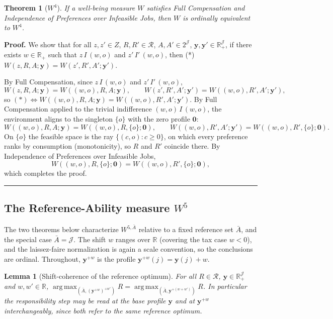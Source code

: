 \documentclass[12pt,thmsb]{article}
\DeclareMathOperator*{\argmax}{arg\,max}
\newtheorem{theorem}{Theorem}
\newtheorem{lemma}{Lemma}
\newenvironment{proof}[1][Proof]{\noindent \textbf{#1.} }{\  \rule{0.5em}{0.5em}}
\begin{document}
\begin{theorem}[$W^4$]
\label{thm:w4}
If a well-being measure $W$ satisfies Full Compensation and Independence of
Preferences over Infeasible Jobs, then $W$ is ordinally equivalent to $W^4$.
\end{theorem}

\begin{proof}
We show that for all $z,z'\in Z$, $R,R'\in\mathcal R$, $A,A'\in 2^{\mathcal J}$,
$\mathbf y,\mathbf y'\in\mathbb R_+^{\mathcal J}$, if there exists
$w\in\mathbb R_+$ such that $z\,I\,(w,o)$ and $z'\,I'\,(w,o)$, then (*)
$W(z,R,A;\mathbf y)=W(z',R',A';\mathbf y')$.

By Full Compensation, since $z\,I\,(w,o)$ and $z'\,I'\,(w,o)$,
\begin{equation*}
W(z,R,A;\mathbf y)=W((w,o),R,A;\mathbf y),\qquad
W(z',R',A';\mathbf y')=W((w,o),R',A';\mathbf y'),
\end{equation*}
so $(*)\Leftrightarrow W((w,o),R,A;\mathbf y)=W((w,o),R',A';\mathbf y')$. By
Full Compensation applied to the trivial indifference $(w,o)\,I\,(w,o)$, the
environment aligns to the singleton $\{o\}$ with the zero profile $\mathbf 0$:
\begin{equation*}
W((w,o),R,A;\mathbf y)=W((w,o),R,\{o\};\mathbf 0),\qquad
W((w,o),R',A';\mathbf y')=W((w,o),R',\{o\};\mathbf 0).
\end{equation*}
On $\{o\}$ the feasible space is the ray $\{(c,o):c\geq 0\}$, on which every
preference ranks by consumption (monotonicity), so $R$ and $R'$ coincide there.
By Independence of Preferences over Infeasible Jobs,
\begin{equation*}
W((w,o),R,\{o\};\mathbf 0)=W((w,o),R',\{o\};\mathbf 0),
\end{equation*}
which completes the proof.
\end{proof}

\subsection{The Reference-Ability measure $W^5$}

The two theorems below characterize $W^{5,\bar A}$ relative to a fixed reference
set $\bar A$, and the special case $\bar A=\mathcal J$. The shift $w$ ranges
over $\mathbb R$ (covering the tax case $w<0$), and the laissez-faire
normalization is again a scale convention, so the conclusions are ordinal.
Throughout, $\mathbf y^{+w}$ is the profile $\mathbf y^{+w}(j)=\mathbf y(j)+w$.

\begin{lemma}[Shift-coherence of the reference optimum]
\label{lem:w5shift}
For all $R\in\mathcal R$, $\mathbf y\in\mathbb R_+^{\mathcal J}$ and
$w,w'\in\mathbb R$,
$\argmax_{(\bar A,(\mathbf y^{+w})^{+w'})}R=\argmax_{(\bar A,\mathbf
y^{+(w+w')})}R$. In particular the responsibility step may be read at the base
profile $\mathbf y$ and at $\mathbf y^{+w}$ interchangeably, since both refer to
the same reference optimum.
\end{lemma}
\end{document}
